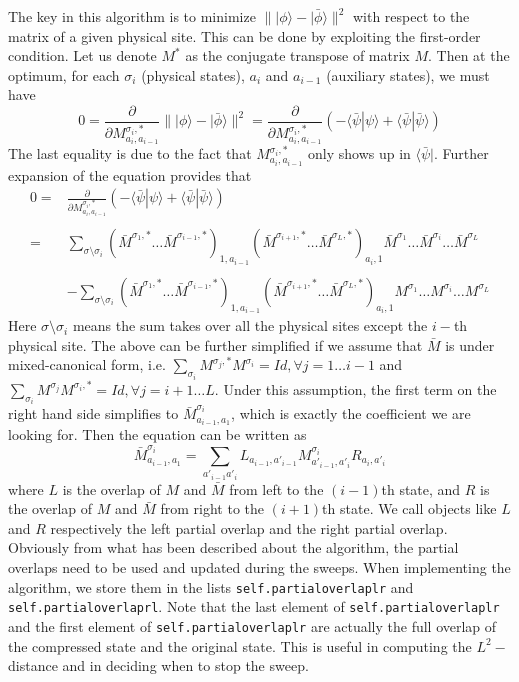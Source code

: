 \documentclass[english]{article}[12pt]
\begin{document}
The key in this algorithm is to minimize $\||\phi \rangle-|\bar\phi\rangle\|^2$ with respect to the matrix of a given physical site. This can be done by exploiting the first-order condition. Let us denote $M^*$ as the conjugate transpose of matrix $M$. Then at the optimum, for each $\sigma_i$ (physical states), $a_i$ and $a_{i-1}$ (auxiliary states), we must have
\[
0=\frac{\partial}{\partial M^{\sigma_i,*}_{a_i,a_{i-1}}} \||\phi \rangle-|\bar\phi\rangle\|^2 = \frac{\partial}{\partial M^{\sigma_i,*}_{a_i,a_{i-1}}} \left(-\langle\bar\psi | \psi\rangle +  \langle\bar\psi |\bar \psi\rangle \right)
\]
The last equality is due to the fact that $M^{\sigma_i,*}_{a_i,a_{i-1}}$ only shows up in $\langle\bar\psi|$. Further expansion of the equation provides that
\[
\begin{array}{rl}
0=&\displaystyle\frac{\partial}{\partial M^{\sigma_i,*}_{a_i,a_{i-1}}} \left(-\langle\bar\psi | \psi\rangle +  \langle\bar\psi |\bar \psi\rangle \right)\\\\
=&\displaystyle \sum_{\sigma\setminus\sigma_i}(\bar M^{\sigma_1,*}\dots\bar M^{\sigma_{i-1},*})_{1,a_{i-1}}(\bar M^{\sigma_{i+1},*}\dots\bar M^{\sigma_{L},*})_{a_{i},1}\bar M^{\sigma_1}\dots \bar M^{\sigma_i}\dots\bar M^{\sigma_L}\\\\
&-\displaystyle \sum_{\sigma\setminus\sigma_i}(\bar M^{\sigma_1,*}\dots\bar M^{\sigma_{i-1},*})_{1,a_{i-1}}(\bar M^{\sigma_{i+1},*}\dots\bar M^{\sigma_{L},*})_{a_{i},1} M^{\sigma_1}\dots  M^{\sigma_i}\dots M^{\sigma_L}
\end{array}
\]
Here $\sigma\setminus\sigma_i$ means the sum takes over all the physical sites except the $i-$th physical site. The above can be further simplified if we assume that $\bar M$ is under mixed-canonical form, i.e. $\sum_{\sigma_i}M^{\sigma_j,*}M^{\sigma_i}=Id, \forall j=1\dots i-1$ and $\sum_{\sigma_i}M^{\sigma_j}M^{\sigma_i,*}=Id, \forall j=i+1\dots L$. Under this assumption, the first term on the right hand side simplifies to $\bar M^{\sigma_i}_{a_{i-1},a_1}$, which is exactly the coefficient we are looking for. Then the equation can be written as
\[
\bar M^{\sigma_i}_{a_{i-1},a_1}=\sum_{a'_{i-1}a'_i}L_{a_{i-1},a'_{i-1}}M^{\sigma_i}_{a'_{i-1},a'_i}R_{a_i,a'_i}
\]
where $L$ is the overlap of $M$ and $\bar M$ from left to the $(i-1)$th state, and $R$ is the overlap of $M$ and $\bar M$ from right to the $(i+1)$th state. We call objects like $L$ and $R$ respectively the left partial overlap and the right partial overlap. Obviously from what has been described about the algorithm, the partial overlaps need to be used and updated during the sweeps. When implementing the algorithm, we store them in the lists \texttt{self.partial\textunderscore overlap\textunderscore lr} and \texttt{self.partial\textunderscore overlap\textunderscore rl}. Note that the last element of \texttt{self.partial\textunderscore overlap\textunderscore lr} and the first element of \texttt{self.partial\textunderscore overlap\textunderscore lr} are actually the full overlap of the compressed state and the original state. This is useful in computing the $L^2-$distance and in deciding when to stop the sweep.
\end{document}
